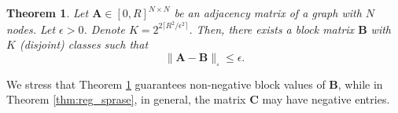 \documentclass{article}
\theoremstyle{plain}
\newtheorem{theorem}{Theorem}[section]
\theoremstyle{definition}
\theoremstyle{remark}
\begin{document}
\begin{theorem}
\label{thm:reg_sprase2}
     Let $\mathbf{A}\in[0,R]^{N\times N}$ be an adjacency matrix of a graph with $N$ nodes. Let $\epsilon>0$. Denote $K=2^{2\lceil R^2/\epsilon^2\rceil}$.         Then, there exists a block matrix  $\mathbf{B}$ with $K$ (disjoint) classes such that 
    \begin{equation}
        \label{eq:reg_sparse2}
    \|\mathbf{A}-\mathbf{B}\|_{\square} \leq \epsilon.
    \end{equation}
\end{theorem}


We stress that Theorem \ref{thm:reg_sprase2} guarantees non-negative block values of $\mathbf{B}$, while in Theorem \ref{thm:reg_sprase}, in general, the matrix $\mathbf{C}$ may have negative entries.

\end{document}
